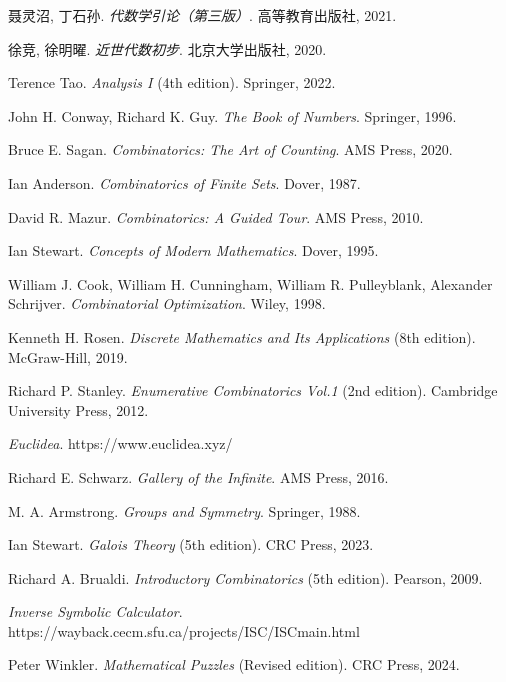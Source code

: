 
\begin{thebibliography}{}

 聂灵沼, 丁石孙.
\textit{代数学引论（第三版）}. 高等教育出版社, 2021.

 徐竞, 徐明曜.
\textit{近世代数初步}. 北京大学出版社, 2020.

 Terence Tao. \textit{Analysis I} (4th edition). Springer, 2022.

 John H. Conway, Richard K. Guy. \textit{The Book of Numbers}. Springer, 1996.

  Bruce E. Sagan. \textit{Combinatorics: The Art of Counting}. AMS Press, 2020.

 Ian Anderson. \textit{Combinatorics of Finite Sets}. Dover, 1987.

 David R. Mazur. \textit{Combinatorics: A Guided Tour}. AMS Press, 2010.

 Ian Stewart. \textit{Concepts of Modern Mathematics}. Dover, 1995. 

 William J. Cook, William H. Cunningham, William R. Pulleyblank, Alexander Schrijver. \textit{Combinatorial Optimization}. Wiley, 1998.

 Kenneth H. Rosen. \textit{Discrete Mathematics and Its Applications} (8th edition). McGraw-Hill, 2019.

 Richard P. Stanley. \textit{Enumerative Combinatorics Vol.1} (2nd edition). Cambridge University Press, 2012.

\textit{Euclidea}. https://www.euclidea.xyz/

 Richard E. Schwarz.
\textit{Gallery of the Infinite}. AMS Press, 2016.

 M. A. Armstrong. 
\textit{Groups and Symmetry}. Springer, 1988.

 Ian Stewart. 
\textit{Galois Theory} (5th edition). CRC Press, 2023.

 Richard A. Brualdi. 
\textit{Introductory Combinatorics} (5th edition). Pearson, 2009.

\textit{Inverse Symbolic Calculator}. https://wayback.cecm.sfu.ca/projects/ISC/ISCmain.html

 Peter Winkler. 
\textit{Mathematical Puzzles} (Revised edition). CRC Press, 2024.


\end{thebibliography}

